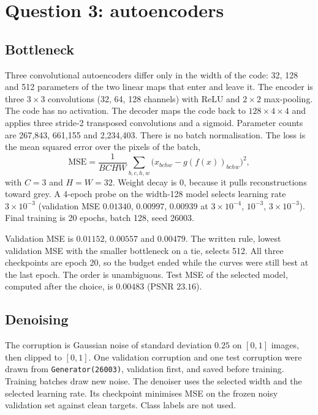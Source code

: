 \documentclass[10pt,twocolumn,letterpaper]{article}
\begin{document}
\section{Question 3: autoencoders}
\subsection{Bottleneck}
Three convolutional autoencoders differ only in the width of the code: 32, 128 and 512 parameters of the two linear maps that enter and leave it. The encoder is three $3{\times}3$ convolutions (32, 64, 128 channels) with ReLU and $2{\times}2$ max-pooling. The code has no activation. The decoder maps the code back to $128{\times}4{\times}4$ and applies three stride-2 transposed convolutions and a sigmoid. Parameter counts are 267{,}843, 661{,}155 and 2{,}234{,}403. There is no batch normalisation. The loss is the mean squared error over the pixels of the batch,
\begin{equation}
\mathrm{MSE} = \frac{1}{BCHW}\sum_{b,c,h,w}\bigl(x_{bchw}-g(f(x))_{bchw}\bigr)^2,
\end{equation}
with $C{=}3$ and $H{=}W{=}32$. Weight decay is 0, because it pulls reconstructions toward grey. A 4-epoch probe on the width-128 model selects learning rate $3{\times}10^{-3}$ (validation MSE $0.01340$, $0.00997$, $0.00939$ at $3{\times}10^{-4}$, $10^{-3}$, $3{\times}10^{-3}$). Final training is 20 epochs, batch 128, seed 26003.

Validation MSE is $0.01152$, $0.00557$ and $0.00479$. The written rule, lowest validation MSE with the smaller bottleneck on a tie, selects 512. All three checkpoints are epoch 20, so the budget ended while the curves were still best at the last epoch. The order is unambiguous. Test MSE of the selected model, computed after the choice, is $0.00483$ (PSNR $23.16$).

\subsection{Denoising}
The corruption is Gaussian noise of standard deviation $0.25$ on $[0,1]$ images, then clipped to $[0,1]$. One validation corruption and one test corruption were drawn from \texttt{Generator(26003)}, validation first, and saved before training. Training batches draw new noise. The denoiser uses the selected width and the selected learning rate. Its checkpoint minimises MSE on the frozen noisy validation set against clean targets. Class labels are not used.
\end{document}
